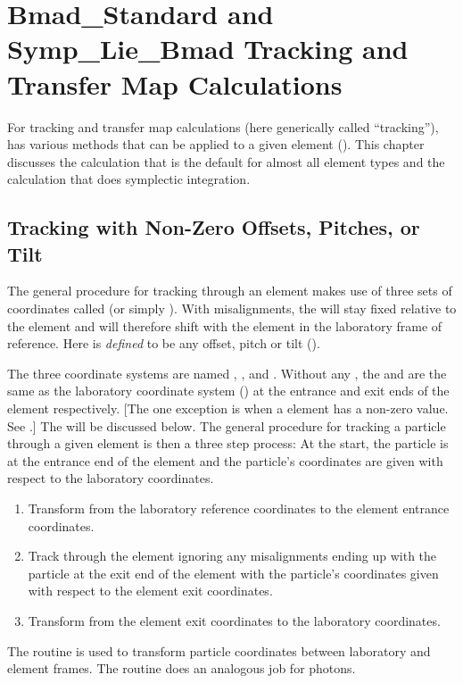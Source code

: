 \chapter[Tracking and Transfer Map Calculations]
{Bmad\_Standard and Symp\_Lie\_Bmad Tracking and Transfer Map Calculations}
\label{c:bmad.std}

For tracking and transfer map calculations (here generically called
``tracking''), \bmad has various methods that can be applied to a
given element (). This chapter discusses the
 calculation that is the default for almost all
element types and the  calculation that does
symplectic integration.

\section{Tracking with Non-Zero Offsets, Pitches, or Tilt}
\label{s:misalign.track}

The general procedure for tracking through an element makes use of
three sets of coordinates called  (or simply ).  With
misalignments, the  will stay fixed relative
to the element and will therefore shift with the element in the
laboratory frame of reference.  Here  is {\em
defined} to be any offset, pitch or tilt ().

The three coordinate systems are named , , and . Without any , the  and  are the same
as the laboratory coordinate system () at the entrance and
exit ends of the element respectively. [The one exception is when
a  element has a non-zero  value. See
.] The  will be
discussed below. The general procedure for tracking a particle through
a given element is then a three step process: At the start, the
particle is at the entrance end of the element and the particle's
coordinates are given with respect to the laboratory coordinates.
\begin{enumerate}
\item
Transform from the laboratory reference coordinates to the element
entrance coordinates.
\item
Track through the element ignoring any misalignments ending up with
the particle at the exit end of the element with the particle's
coordinates given with respect to the element exit coordinates.
\item
Transform from the element exit coordinates to the laboratory
coordinates.
\end{enumerate}
The  routine is used to
transform particle coordinates between laboratory and element
frames. The  routine does an
analogous job for photons.

